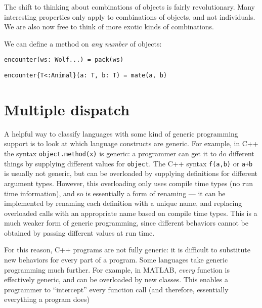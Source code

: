 The shift to thinking about combinations of objects is fairly
revolutionary. Many interesting properties only apply to combinations
of objects, and not individuals. We are also now free to think of
more exotic kinds of combinations.

We can define a method on \emph{any number} of objects:

\begin{verbatim}
encounter(ws: Wolf...) = pack(ws)
\end{verbatim}


\begin{verbatim}
encounter{T<:Animal}(a: T, b: T) = mate(a, b)
\end{verbatim}



\section{Multiple dispatch}



A helpful way to classify languages with some kind of generic programming
support is to look at which language constructs are generic. For example,
in C++ the syntax \texttt{object.method(x)} is generic: a programmer can
get it to do different things by supplying different values for
\texttt{object}. The C++ syntax \texttt{f(a,b)} or \texttt{a+b} is
usually not generic, but can be overloaded by supplying definitions for
different argument types. However, this overloading only uses compile time
types (no run time information), and so is essentially a form of renaming ---
it can be implemented by renaming each definition with a unique name, and
replacing overloaded calls with an appropriate name based on compile time
types. This is a much weaker form of generic programming, since different
behaviors cannot be obtained by passing different values at run time.

For this reason, C++ programs are not fully generic: it is difficult to
substitute new behaviors for every part of a program. Some languages
take generic programming much further. For example, in MATLAB, \emph{every}
function is effectively generic, and can be overloaded by new classes.
This enables a programmer to ``intercept'' every function call (and therefore,
essentially everything a program does)


